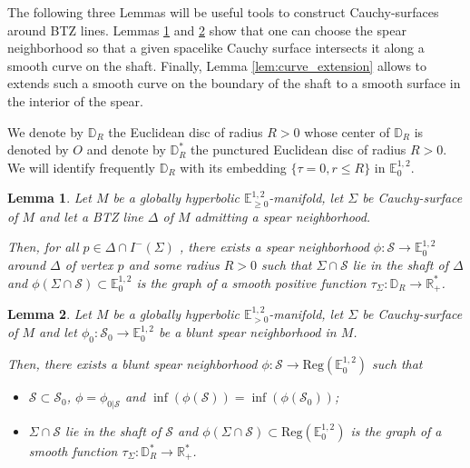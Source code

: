 \documentclass[a4paper,12pt]{article}
\def\S{\mathcal S}
\def\S{\mathcal{S}}
\def\RR{\mathbb{R}}
\newcommand{\mass}[1]{{\mathbb E}^{1,2}_{#1}}
\def\Reg{\mathrm{Reg}}
\newtheorem{lemou}{Lemma}[section]          %
\begin{document}
    
   The following three Lemmas will be useful tools to construct Cauchy-surfaces  around BTZ lines. Lemmas \ref{lem:add_BTZ_param} and \ref{lem:blunt_spear_neighborhood} show that one can choose the spear neighborhood so that a given spacelike Cauchy surface intersects it along a smooth curve on the shaft. Finally, Lemma \ref{lem:curve_extension} allows to extends such a smooth curve on the boundary of the shaft to a smooth surface in the interior of the spear. 
   
   


   
   
   We denote by $\mathbb D_R$ the Euclidean disc of radius $R>0$ whose center of $\mathbb D_R$ is denoted by $O$ and denote by  $\mathbb D_R^*$ the punctured  Euclidean disc of radius  $R>0$.
     We will identify frequently $\mathbb D_R$ with its embedding $\{\tau=0,r\leq R\}$ in $\mass{0}$.
  
   
	
	\begin{lemou}\label{lem:add_BTZ_param}
        Let $M$ be a globally hyperbolic  $\mass{\geq0}$-manifold, let $\Sigma$ be Cauchy-surface of $M$ and let a BTZ line $\Delta$ of $M$ admitting a spear neighborhood.  
	
        Then,  for all  $p\in \Delta\cap I^-(\Sigma)$ , there exists a spear neighborhood $\phi:\mathcal S \rightarrow \mass{0}$ around $\Delta$ of vertex $p$ and some radius $R>0$ such that 
        $\Sigma\cap \S$ lie in the shaft of $\Delta$ and 
        $\phi(\Sigma\cap \mathcal S)\subset \mass{0}$ is the graph of a smooth positive function $\tau_\Sigma: \mathbb D_R\rightarrow \RR_+^*$. 
    \end{lemou}

\begin{lemou}\label{lem:blunt_spear_neighborhood}
        Let $M$ be a globally hyperbolic  $\mass{>0}$-manifold, let $\Sigma$ be Cauchy-surface of $M$ and let $\phi_0: \mathcal S_0\rightarrow \mass{0}$ be a blunt spear neighborhood in $M$.  
	
	Then, there exists a blunt spear neighborhood $\phi:\mathcal S \rightarrow \Reg(\mass{0})$ such that 
	\begin{itemize}
	\item $\mathcal S\subset \mathcal S_0$, $\phi = \phi_{0|\mathcal S}$ and $\inf(\phi(\S))=\inf(\phi(\S_0))$;
	\item  $\Sigma\cap   \mathcal S$ lie in the shaft of $\mathcal S$ and $\phi(\Sigma\cap \mathcal S)\subset \Reg(\mass{0})$ is the graph of a smooth function $\tau_\Sigma: \mathbb D_R^*\rightarrow \RR_+^*$.  	
	\end{itemize}
     \end{lemou} 
 
\end{document}
